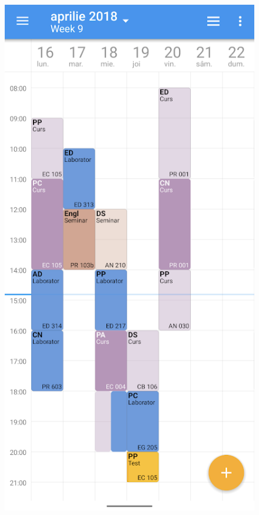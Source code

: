         \begin{figure}[!h]
            \centering
                \begin{minipage}[b]{0.39\textwidth}
                    \captionsetup{justification=centering}
                    \includegraphics[width=\textwidth]{figures/uni_apps/features/school_assistant_timetable.png}

\end{minipage}
\end{figure}
